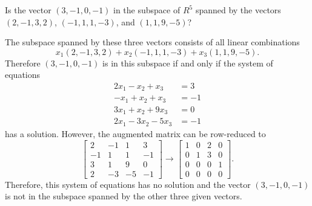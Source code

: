  Is the vector $(3,-1,0,-1)$ in the subspace of $R^5$
spanned by the vectors $(2,-1,3,2)$, $(-1,1,1,-3)$, and $(1,1,9,-5)$?
\begin{solution}
  The subspace spanned by these three vectors consists of all linear
  combinations
  \begin{equation*}
    x_1(2,-1,3,2) + x_2(-1,1,1,-3) + x_3(1,1,9,-5).
  \end{equation*}
  Therefore $(3,-1,0,-1)$ is in this subspace if and only if the
  system of equations
  \begin{align*}
    2x_1 - x_2 + x_3 &= 3 \\
    -x_1 + x_2 + x_3 &= -1 \\
    3x_1 + x_2 + 9x_3 &= 0 \\
    2x_1 - 3x_2 - 5x_3 &= -1
  \end{align*}
  has a solution. However, the augmented matrix can be row-reduced to
  \begin{equation*}
    \begin{bmatrix}
      2 & -1 & 1 & 3 \\
      -1 & 1 & 1 & -1 \\
      3 & 1 & 9 & 0 \\
      2 & -3 & -5 & -1
    \end{bmatrix}
    \rightarrow
    \begin{bmatrix}
      1 & 0 & 2 & 0 \\
      0 & 1 & 3 & 0 \\
      0 & 0 & 0 & 1 \\
      0 & 0 & 0 & 0
    \end{bmatrix}.
  \end{equation*}
  Therefore, this system of equations has no solution and the vector
  $(3,-1,0,-1)$ is not in the subspace spanned by the other three
  given vectors.
\end{solution}

